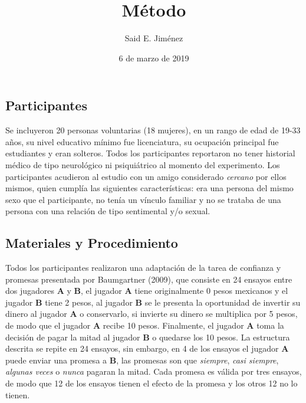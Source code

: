 \documentclass[]{article}
\title{Método}
\author{Said E. Jiménez}
\date{6 de marzo de 2019}
\begin{document}
\maketitle

{
\setcounter{tocdepth}{3}
\tableofcontents
}
\subsection{Participantes}\label{participantes}

Se incluyeron 20 personas voluntarias (18 mujeres), en un rango de edad
de 19-33 años, su nivel educativo mínimo fue licenciatura, su ocupación
principal fue estudiantes y eran solteros. Todos los participantes
reportaron no tener historial médico de tipo neurológico ni psiquiátrico
al momento del experimento. Los participantes acudieron al estudio con
un amigo considerado \emph{cercano} por ellos mismos, quien cumplía las
siguientes características: era una persona del mismo sexo que el
participante, no tenía un vínculo familiar y no se trataba de una
persona con una relación de tipo sentimental y/o sexual.

\subsection{Materiales y
Procedimiento}\label{materiales-y-procedimiento}

Todos los participantes realizaron una adaptación de la tarea de
confianza y promesas presentada por Baumgartner (2009), que consiste en
24 ensayos entre dos jugadores \textbf{A} y \textbf{B}, el jugador
\textbf{A} tiene originalmente 0 pesos mexicanos y el jugador \textbf{B}
tiene 2 pesos, al jugador \textbf{B} se le presenta la oportunidad de
invertir su dinero al jugador \textbf{A} o conservarlo, si invierte su
dinero se multiplica por 5 pesos, de modo que el jugador \textbf{A}
recibe 10 pesos. Finalmente, el jugador \textbf{A} toma la decisión de
pagar la mitad al jugador \textbf{B} o quedarse los 10 pesos. La
estructura descrita se repite en 24 ensayos, sin embargo, en 4 de los
ensayos el jugador \textbf{A} puede enviar una promesa a \textbf{B}, las
promesas son que \emph{siempre}, \emph{casi siempre}, \emph{algunas
veces} o \emph{nunca} pagaran la mitad. Cada promesa es válida por tres
ensayos, de modo que 12 de los ensayos tienen el efecto de la promesa y
los otros 12 no lo tienen.
\end{document}
